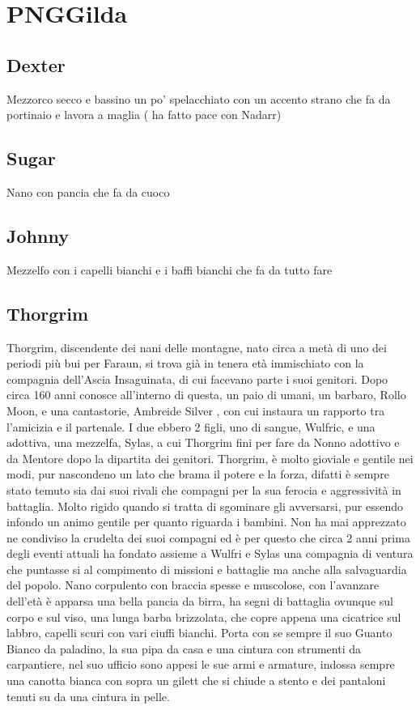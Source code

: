 \documentclass{article}
\begin{document}
\section{PNGGilda}
          \subsection{Dexter}
Mezzorco secco e bassino un po' spelacchiato con un accento strano che fa da portinaio e lavora a maglia ( ha fatto pace con Nadarr)
          \subsection{Sugar}
Nano con pancia che fa da cuoco
          \subsection{Johnny}
Mezzelfo con i capelli bianchi e i baffi bianchi che fa da tutto fare
          \subsection{Thorgrim}
Thorgrim, discendente dei nani delle montagne, nato circa a metà di uno dei periodi più bui per Faraun, si trova già in tenera età immischiato con la compagnia dell'Ascia Insaguinata, di cui facevano parte i suoi genitori. Dopo circa 160 anni conosce all'interno di questa, un paio di umani, un barbaro, Rollo Moon, e una cantastorie, Ambreide Silver , con cui instaura un rapporto tra l'amicizia e il partenale. I due ebbero 2 figli, uno di sangue, Wulfric, e una adottiva, una mezzelfa, Sylas, a cui Thorgrim fini per fare da Nonno adottivo e da Mentore dopo la dipartita dei genitori. Thorgrim, è molto gioviale e gentile nei modi, pur nascondeno un lato che brama il potere e la forza, difatti è sempre stato temuto sia dai suoi rivali che compagni per  la sua ferocia e aggressività in battaglia. Molto rigido quando si tratta di sgominare gli avversarsi, pur essendo infondo un animo gentile per quanto riguarda i bambini. Non ha mai apprezzato ne condiviso la crudelta dei suoi compagni ed è per questo che circa 2 anni prima degli eventi attuali ha fondato assieme a Wulfri e Sylas una compagnia di ventura  che puntasse si al compimento di missioni e battaglie ma anche alla salvaguardia del popolo. Nano corpulento con braccia spesse e muscolose, con l'avanzare dell'età è apparsa una bella pancia da birra, ha segni di battaglia ovunque sul corpo e sul viso, una lunga barba brizzolata, che copre appena una cicatrice sul labbro, capelli scuri con vari ciuffi bianchi. Porta con se sempre il suo Guanto Bianco da paladino, la sua pipa da casa e una cintura con strumenti da carpantiere, nel suo ufficio sono appesi le sue armi e armature, indossa sempre una canotta bianca con sopra un gilett che si chiude a stento e dei pantaloni tenuti su da una cintura in pelle.
\end{document}
